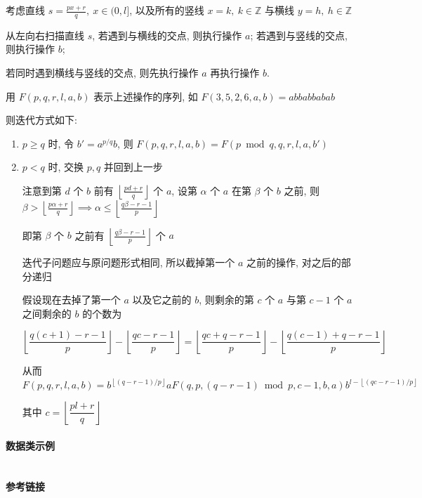 考虑直线 \(s=\frac{px+r}{q},~x\in (0,l]\), 以及所有的竖线 \(x=k,~k\in\mathbb{Z}\) 与横线 \(y=h,~h\in\mathbb{Z}\)

从左向右扫描直线 \(s\), 若遇到与横线的交点, 则执行操作 \(a\); 若遇到与竖线的交点, 则执行操作 \(b\);

若同时遇到横线与竖线的交点, 则先执行操作 \(a\) 再执行操作 \(b\).

用 \(F(p,q,r,l,a,b)\) 表示上述操作的序列, 如 \(F(3,5,2,6,a,b)=abbabbabab\)

则迭代方式如下:

\begin{enumerate}
    \item \(p\geq q\) 时, 令 \(b'=a^{p/q}b\), 则 \(F(p,q,r,l,a,b)=F(p\bmod q,q,r,l,a,b')\)
    \item \(p<q\) 时, 交换 \(p,q\) 并回到上一步
          
          注意到第 \(d\) 个 \(b\) 前有 \(\left\lfloor\frac{pd+r}{q}\right\rfloor\) 个 \(a\), 设第 \(\alpha\) 个 \(a\) 在第 \(\beta\) 个 \(b\) 之前, 则 \(\displaystyle \beta > \left\lfloor\frac{p\alpha+r}{q}\right\rfloor \implies \alpha \leq \left\lfloor\frac{q\beta-r-1}{p}\right\rfloor\)
          
          即第 \(\beta\) 个 \(b\) 之前有 \(\left\lfloor\frac{q\beta-r-1}{p}\right\rfloor\) 个 \(a\)
          
          迭代子问题应与原问题形式相同, 所以截掉第一个 \(a\) 之前的操作, 对之后的部分递归
          
          假设现在去掉了第一个 \(a\) 以及它之前的 \(b\), 则剩余的第 \(c\) 个 \(a\) 与第 \(c-1\) 个 \(a\) 之间剩余的 \(b\) 的个数为
          
          \[
              \left\lfloor\frac{q(c+1)-r-1}{p}\right\rfloor-\left\lfloor\frac{qc-r-1}{p}\right\rfloor=\left\lfloor\frac{qc+q-r-1}{p}\right\rfloor-\left\lfloor\frac{q(c-1)+q-r-1}{p}\right\rfloor
          \]
          
          从而 \(\displaystyle F(p,q,r,l,a,b)=b^{\left\lfloor (q-r-1)/p \right\rfloor}aF(q,p,(q-r-1)\bmod p,c-1,b,a)b^{l-\left\lfloor (qc-r-1)/p \right\rfloor}\)
          
          其中 \(c=\left\lfloor\dfrac{pl+r}{q}\right\rfloor\)
\end{enumerate}

\paragraph{数据类示例}

\inputminted{cpp}{src/src/exeuclid_node.cpp}

\paragraph{参考链接}

